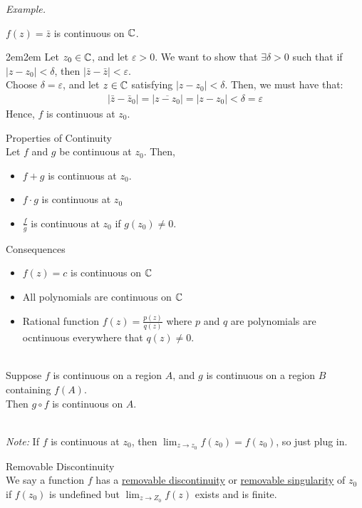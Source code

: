 \documentclass[10pt]{paper}
\newcommand{\gspc}{\vspace{0.13cm}} %
\newcommand{\gline}[0]{\gspc\\} %
\newcommand{\ul}[1]{\underline{#1}}
\let\endoldproof\endproof
\renewenvironment{proof}[1][\proofname]
  {\vspace{0.2cm}\begin{adjustwidth}{2em}{2em}
   \oldproof[#1]}
  {\endoldproof
\end{adjustwidth}}
\renewenvironment{example}{
  \begin{tcolorbox}[colback=gray!2, colframe=gray!40!white, coltitle=green!20!black, boxrule=3pt, sharp corners, breakable]
    \textit{Example.}
}{\end{tcolorbox}}
\begin{document}
\begin{example}
  $f(z) = \bar z$ is continuous on $\mathbb{C}$. 
  \begin{proof}
    Let $z_0\in\mathbb{C}$, and let $\varepsilon > 0$. We want to show that $\exists\delta > 0$ such that if $|z-z_0|<\delta$, then $|\bar z - \bar z| < \varepsilon$. \gline{}
    Choose $\delta = \varepsilon$, and let $z\in \mathbb{C}$ satisfying $|z-z_0|<\delta$. Then, we must have that:
    \begin{align*}
      |\bar z - \bar z_0|=|\overline{z-z_0}|=|z-z_0| < \delta = \varepsilon
    \end{align*}
    Hence, $f$ is continuous at $z_0$. 
  \end{proof}
\end{example}
\begin{theorem}{Properties of Continuity}{}\gline{}
  Let $f$ and $g$ be continuous at $z_0$. Then,
  \begin{itemize}
    \item $f+g$ is continuous at $z_0$. 
    \item $f\cdot g$ is continuous at $z_0$
    \item $\frac{f}g$ is continuous at $z_0$ if $g(z_0)\ne 0$. 
  \end{itemize}
  \begin{corollary}{Consequences}{}
    \begin{itemize}
      \item $f(z)=c$ is continuous on $\mathbb{C}$
      \item All polynomials are continuous on $\mathbb{C}$
      \item Rational function $f(z) = \frac{p(z)}{q(z)}$ where $p$ and $q$ are polynomials are ocntinuous everywhere that $q(z) \ne 0$. 
    \end{itemize}
  \end{corollary}
\end{theorem}
\begin{theorem}{}{}\gline{}
  Suppose $f$ is continuous on a region $A$, and $g$ is continuous on a region $B$ containing $f(A)$.\gline{}
  Then $g\circ f$ is continuous on $A$. 
\end{theorem}
\begin{criterion}{}{}\gline{}
  \noindent\textit{Note: }If $f$ is continuous at $z_0$, then $\lim_{z\to z_0}f(z_0)= f(z_0)$, so just plug in. 
\end{criterion}
\begin{definition}{Removable Discontinuity}{}\gline{}
  We say a function $f$ has a \ul{removable discontinuity} or \ul{removable singularity} of $z_0$ if $f(z_0)$ is undefined but $\lim_{z\to Z_0}f(z)$ exists and is finite.  
\end{definition}
\end{document}
